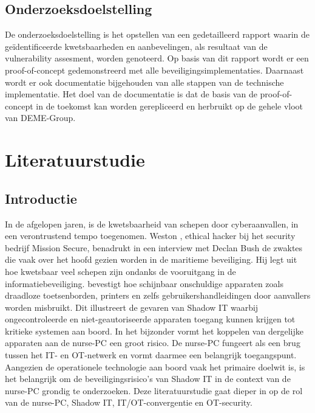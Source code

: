 \subsection{Onderzoeksdoelstelling}
De onderzoeksdoelstelling is het opstellen van een gedetailleerd rapport waarin de geïdentificeerde kwetsbaarheden en aanbevelingen, als resultaat van de vulnerability assesment, worden genoteerd.
Op basis van dit rapport wordt er een proof-of-concept gedemonstreerd met alle beveiligingsimplementaties.
Daarnaast wordt er ook documentatie bijgehouden van alle stappen van de technische implementatie.
Het doel van de documentatie is dat de basis van de proof-of-concept in de toekomst kan worden gerepliceerd en herbruikt op de gehele vloot van DEME-Group.



\section{Literatuurstudie}%
\label{sec:literatuurstudie}
\subsection{Introductie}
In de afgelopen jaren, is de kwetsbaarheid van schepen door cyberaanvallen, in een verontrustend tempo toegenomen. Weston \textcite{Hecker2021}, ethical hacker bij het security bedrijf 
Mission Secure, benadrukt in een interview met Declan Bush de zwaktes die vaak over het hoofd gezien worden in de maritieme beveiliging. Hij
legt uit hoe kwetsbaar veel schepen zijn ondanks de vooruitgang in de informatiebeveiliging. \textcite{Hecker2021} bevestigt hoe schijnbaar onschuldige apparaten zoals draadloze toetsenborden, printers en 
zelfs gebruikershandleidingen door aanvallers worden misbruikt. Dit illustreert de gevaren van Shadow IT waarbij ongecontroleerde en niet-geautoriseerde apparaten toegang kunnen krijgen tot kritieke systemen aan boord. 
In het bijzonder vormt het koppelen van dergelijke apparaten aan de nurse-PC een groot risico. De nurse-PC fungeert als een brug tussen het IT- en OT-netwerk en vormt daarmee een belangrijk toegangspunt. 
Aangezien de operationele technologie aan boord vaak het primaire doelwit is, is het belangrijk om de beveiligingsrisico's van Shadow IT in de context van de nurse-PC grondig te onderzoeken.
Deze literatuurstudie gaat dieper in op de rol van de nurse-PC, Shadow IT, IT/OT-convergentie en OT-security.

